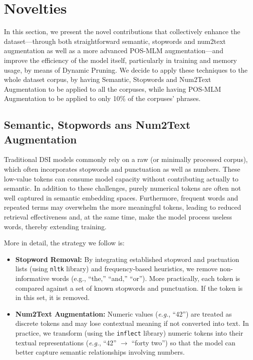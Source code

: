 \section{Novelties}

In this section, we present the novel contributions that collectively enhance the dataset—through both straightforward semantic, stopwords and num2text augmentation as well as a more advanced POS-MLM augmentation—and improve the efficiency of the model itself, particularly in training and memory usage, by means of Dynamic Pruning. We decide to apply these techniques to the whole dataset corpus, by having Semantic, Stopwords and Num2Text Augmentation to be applied to all the corpuses, while having POS-MLM Augmentation to be applied to only 10\% of the corpuses' phrases.








\subsection{Semantic, Stopwords ans Num2Text Augmentation}
Traditional DSI models commonly rely on a raw (or minimally processed corpus), which often incorporates stopwords and punctuation as well as numbers. These low-value tokens can consume model capacity without contributing actually to semantic.  In addition to these challenges, purely numerical tokens are often not well captured in semantic embedding spaces. Furthermore, frequent words and repeated terms may overwhelm the more meaningful tokens, leading to reduced retrieval effectiveness and, at the same time, make the model process useless words, thereby extending training.

More in detail, the strategy we follow is:
\begin{itemize}
    \item \textbf{Stopword Removal:} By integrating established stopword and puctuation lists (using \texttt{nltk} library) and frequency-based heuristics, we remove non-informative words (e.g., ``the,'' ``and,'' ``or''). More practically, each token is compared against a set of known stopwords and punctuation. If the token is in this set, it is removed.
    \item \textbf{ Num2Text Augmentation:} Numeric values (\textit{e.g.}, ``42'') are treated as discrete tokens and may lose contextual meaning if not converted into text. In practice, we transform (using the \texttt{inflect} library) numeric tokens into their textual representations (\textit{e.g.}, ``42'' $\to$ ``forty two'') so that the model can better capture semantic relationships involving numbers.
\end{itemize}










